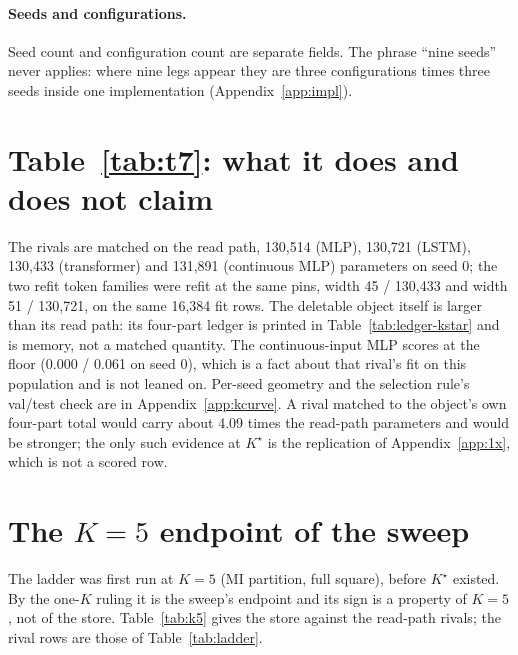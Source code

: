 \documentclass{article}
\newcommand{\Kstar}{\ensuremath{K^{\star}}}
\begin{document}
\paragraph{Seeds and configurations.} Seed count and configuration count are separate fields. The
phrase ``nine seeds'' never applies: where nine legs appear they are three configurations times
three seeds inside one implementation (Appendix~\ref{app:impl}).

\section{Table~\ref{tab:t7}: what it does and does not claim}
\label{app:t7more}
The rivals are matched on the read path,
130,514 (MLP), 130,721 (LSTM), 130,433 (transformer) and 131,891 (continuous MLP) parameters
on seed 0; the two refit token families were refit at the same pins, width 45 / 130,433 and
width 51 / 130,721, on the same 16,384 fit rows.
The deletable object itself is larger than its read path: its four-part ledger is printed in
Table~\ref{tab:ledger-kstar} and is memory, not a matched quantity. The continuous-input MLP
scores at the floor (0.000 / 0.061 on seed 0), which is a fact about that rival's fit on this
population and is not leaned on.
Per-seed geometry and the selection rule's val/test check are in Appendix~\ref{app:kcurve}.
A rival matched to the object's own four-part total would carry about 4.09 times the
read-path parameters and would be stronger; the only such evidence at $\Kstar$ is the
replication of Appendix~\ref{app:1x}, which is not a scored row.


\section{The $K=5$ endpoint of the sweep}
\label{app:k5}

The ladder was first run at $K=5$ (MI partition, full square), before $\Kstar$ existed. By the
one-$K$ ruling it is the sweep's endpoint and its sign is a property of $K=5$, not of the store.
Table~\ref{tab:k5} gives the store against the read-path rivals; the rival rows are those of
Table~\ref{tab:ladder}.
\end{document}
